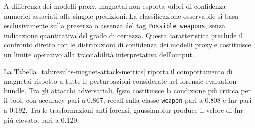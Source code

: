A differenza dei modelli proxy, \gls{magnetai} non esporta valori di confidenza
numerici associati alle singole predizioni. La classificazione osservabile si
basa esclusivamente sulla presenza o assenza del tag \texttt{Possible weapons},
senza indicazione quantitativa del grado di certezza. Questa caratteristica
preclude il confronto diretto con le distribuzioni di confidenza dei modelli
proxy e costituisce un limite operativo alla tracciabilità interpretativa
dell'output.

La Tabella~\ref{tab:results-magnet-attack-metrics} riporta il comportamento di
\gls{magnetai} rispetto a tutte le perturbazioni considerate nel forensic
evaluation bundle. Tra gli attacchi adversariali, \gls{fgsm} costituisce la
condizione più critica per il tool, con accuracy pari a 0.867, recall sulla
classe \texttt{weapon} pari a 0.808 e \gls{fnr} pari a 0.192. Tra le
trasformazioni anti-forensi, \gls{gaussianblur} produce il valore di \gls{fnr}
più elevato, pari a 0.120.

